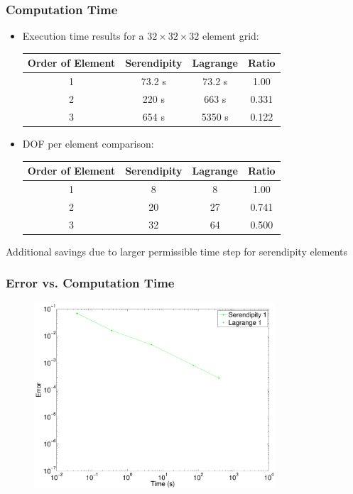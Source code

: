 \documentclass[serif,12pt]{beamer}
\begin{document}
\begin{frame}
\frametitle{Computation Time}
	\begin{itemize}
		\item Execution time results for a $32\times 32 \times 32$ element grid:
		\begin{tabular}{c|c|c|c}
			Order of Element & Serendipity & Lagrange & Ratio \\
			\hline
			1 & 73.2 s & 73.2 s & 1.00 \\
			2 & 220 s & 663 s & 0.331 \\
			3 & 654 s & 5350 s & 0.122\\
		\end{tabular}
		\item DOF per element comparison:
		\begin{tabular}{c|c|c|c}
			Order of Element & Serendipity & Lagrange & Ratio \\
			\hline
			1 & 8   & 8  & 1.00 \\
			2 & 20 & 27 & 0.741 \\
			3 & 32 & 64 & 0.500 \\
		\end{tabular}
	\end{itemize}
	Additional savings due to larger permissible time step for serendipity elements
\end{frame}

\begin{frame}
\frametitle{Error vs. Computation Time}
	\begin{figure}
   		\includegraphics[width=0.8\textwidth]{figures/serendipityConvergence1.pdf}
	\end{figure}
\end{frame}
\end{document}
